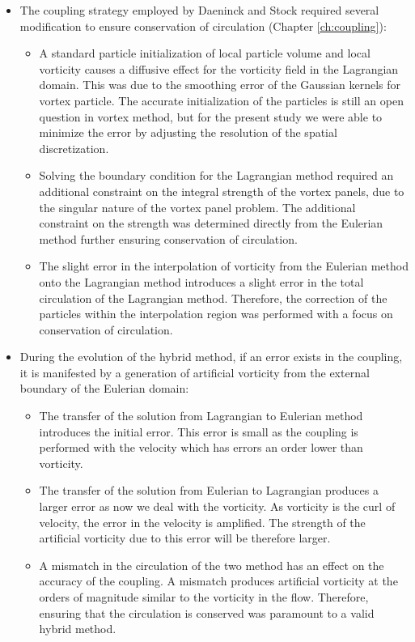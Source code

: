 \begin{itemize}

\item The coupling strategy employed by Daeninck and Stock required several modification to ensure conservation of circulation (Chapter \ref{ch:coupling}):
	\begin{itemize}
	\item A standard particle initialization of local particle volume and local vorticity causes a diffusive effect for the vorticity field in the Lagrangian domain. This was due to the smoothing error of the Gaussian kernels for vortex particle. The accurate initialization of the particles is still an open question in vortex method, but for the present study we were able to minimize the error by adjusting the resolution of the spatial discretization. 

	\item Solving the boundary condition for the Lagrangian method required an additional constraint on the integral strength of the vortex panels, due to the singular nature of the vortex panel problem.  The additional constraint on the strength was determined directly from the Eulerian method further ensuring conservation of circulation.
	
	\item The slight error in the interpolation of vorticity from the Eulerian method onto the Lagrangian method introduces a slight error in the total circulation of the Lagrangian method. Therefore, the correction of the particles within the interpolation region was performed with a focus on conservation of circulation.
	\end{itemize}
	
\item During the evolution of the hybrid method, if an error exists in the coupling, it is manifested by a generation of artificial vorticity from the external boundary of the Eulerian domain:
	\begin{itemize}
	\item The transfer of the solution from Lagrangian to Eulerian method introduces the initial error. This error is small as the coupling is performed with the velocity which has errors an order lower than vorticity.
	\item The transfer of the solution from Eulerian to Lagrangian produces a larger error as now we deal with the vorticity. As vorticity is the curl of velocity, the error in the velocity is amplified. The strength of the artificial vorticity due to this error will be therefore larger.
	\item A mismatch in the circulation of the two method has an effect on the accuracy of the coupling. A mismatch produces artificial vorticity at the orders of magnitude similar to the vorticity in the flow. Therefore, ensuring that the circulation is conserved was paramount to a valid hybrid method.
	\end{itemize}



\end{itemize}
